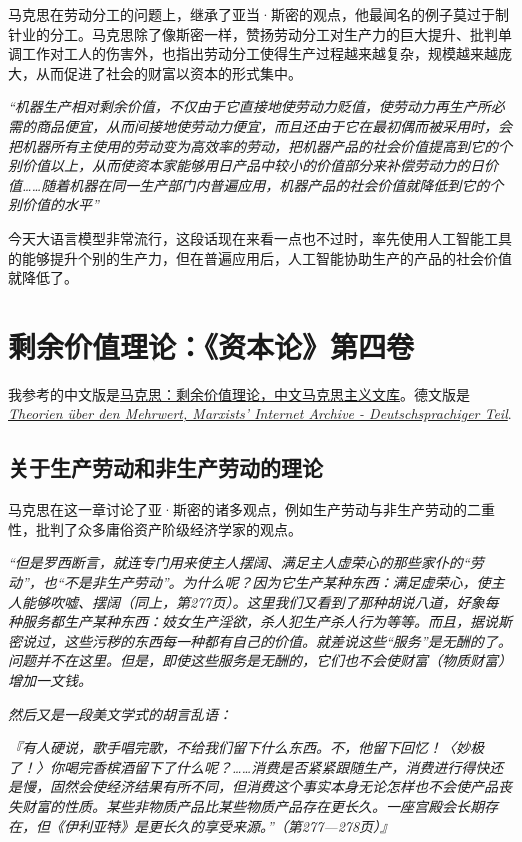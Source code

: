 \documentclass[a4paper]{article}
\begin{document}
马克思在劳动分工的问题上，继承了亚当·斯密的观点，他最闻名的例子莫过于制针业的分工。马克思除了像斯密一样，赞扬劳动分工对生产力的巨大提升、批判单调工作对工人的伤害外，也指出劳动分工使得生产过程越来越复杂，规模越来越庞大，从而促进了社会的财富以资本的形式集中。

\emph{“机器生产相对剩余价值，不仅由于它直接地使劳动力贬值，使劳动力再生产所必需的商品便宜，从而间接地使劳动力便宜，而且还由于它在最初偶而被采用时，会把机器所有主使用的劳动变为高效率的劳动，把机器产品的社会价值提高到它的个别价值以上，从而使资本家能够用日产品中较小的价值部分来补偿劳动力的日价值……随着机器在同一生产部门内普遍应用，机器产品的社会价值就降低到它的个别价值的水平”}

今天大语言模型非常流行，这段话现在来看一点也不过时，率先使用人工智能工具的能够提升个别的生产力，但在普遍应用后，人工智能协助生产的产品的社会价值就降低了。
\section{剩余价值理论：《资本论》第四卷}
我参考的中文版是\href{https://www.marxists.org/chinese/marx-engels/26-1/006.htm}{马克思：剩余价值理论，中文马克思主义文库}。德文版是\emph{\href{https://www.marxists.org/deutsch/archiv/marx-engels/1863/tumw/standard/index.htm}{Theorien über den Mehrwert, Marxists’ Internet Archive - Deutschsprachiger Teil}}.
\subsection{关于生产劳动和非生产劳动的理论}
马克思在这一章讨论了亚·斯密的诸多观点，例如生产劳动与非生产劳动的二重性，批判了众多庸俗资产阶级经济学家的观点。

\emph{“但是罗西断言，就连专门用来使主人摆阔、满足主人虚荣心的那些家仆的“劳动”，也“不是非生产劳动”。为什么呢？因为它生产某种东西：满足虚荣心，使主人能够吹嘘、摆阔（同上，第277页）。这里我们又看到了那种胡说八道，好象每种服务都生产某种东西：妓女生产淫欲，杀人犯生产杀人行为等等。而且，据说斯密说过，这些污秽的东西每一种都有自己的价值。就差说这些“服务”是无酬的了。问题并不在这里。但是，即使这些服务是无酬的，它们也不会使财富（物质财富）增加一文钱。}

\emph{然后又是一段美文学式的胡言乱语：}

\emph{『有人硬说，歌手唱完歌，不给我们留下什么东西。不，他留下回忆！〈妙极了！〉你喝完香槟酒留下了什么呢？……消费是否紧紧跟随生产，消费进行得快还是慢，固然会使经济结果有所不同，但消费这个事实本身无论怎样也不会使产品丧失财富的性质。某些非物质产品比某些物质产品存在更长久。一座宫殿会长期存在，但《伊利亚特》是更长久的享受来源。”（第277—278页）』}
\end{document}

